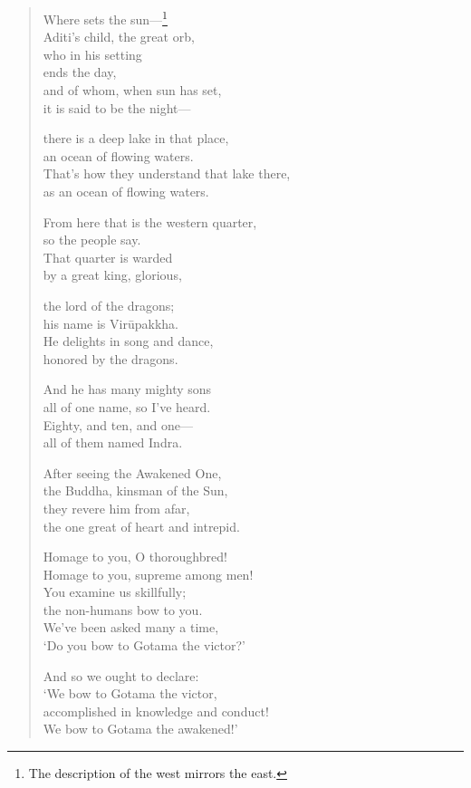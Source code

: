 \documentclass[12pt,openany]{book}%
\begin{document}
\begin{verse}
Where sets the sun—\footnote{The description of the west mirrors the east. } \\
Aditi’s child, the great orb, \\
who in his setting \\
ends the day, \\
and of whom, when sun has set, \\
it is said to be the night—

there is a deep lake in that place, \\
an ocean of flowing waters. \\
That’s how they understand that lake there, \\
as an ocean of flowing waters. 

From here that is the western quarter, \\
so the people say. \\
That quarter is warded \\
by a great king, glorious, 

the lord of the dragons; \\
his name is \textsanskrit{Virūpakkha}. \\
He delights in song and dance, \\
honored by the dragons. 

And he has many mighty sons \\
all of one name, so I’ve heard. \\
Eighty, and ten, and one—\\
all of them named Indra. 

After seeing the Awakened One, \\
the Buddha, kinsman of the Sun, \\
they revere him from afar, \\
the one great of heart and intrepid. 

Homage to you, O thoroughbred! \\
Homage to you, supreme among men! \\
You examine us skillfully; \\
the non-humans bow to you. \\
We’ve been asked many a time, \\
‘Do you bow to Gotama the victor?’ 

And so we ought to declare: \\
‘We bow to Gotama the victor, \\
accomplished in knowledge and conduct! \\
We bow to Gotama the awakened!’ 


\end{verse}
\end{document}
